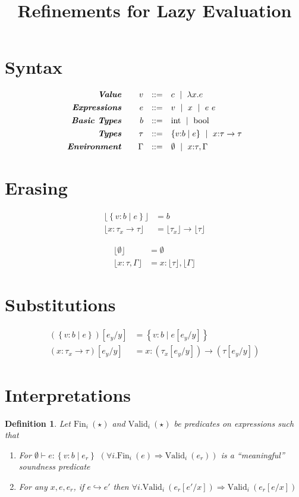 \documentclass[10pt,a4paper]{article}
\title{Refinements for Lazy Evaluation}
\newtheorem{definition}{Definition}
\newcommand\efun[2]{\ensuremath{\lambda #1 . #2}}
\newcommand\eapp[2]{\ensuremath{#1 \ #2}}
\newcommand\tint{\ensuremath{\text{int}}}
\newcommand\tbool{\ensuremath{\text{bool}}}
\newcommand\tref[3]{\ensuremath{\left\lbrace #1 \colon #2 \mid #3 \right\rbrace}}
\newcommand\tfun[3]{\ensuremath{#1\colon #2 \rightarrow #3}}
\newcommand\validi[1]{\ensuremath{\text{Valid}_{i}\ (#1)}}
\newcommand\fini[1]{\ensuremath{\text{Fin}_{i}\ (#1)}}
\newcommand\generalconditionInterp[2]
	{\ensuremath{(\forall i. \fini{#1} \Rightarrow \validi{#2})}}
\newcommand\generalconditionImpl[2]
	{\ensuremath{\forall i . \validi{#1} \Rightarrow \validi{#2}}}
\newcommand\sub[2]{\ensuremath{\left[ #2 / #1 \right]}}
\newcommand\erase[1]{\ensuremath{\lfloor #1 \rfloor}}
\newcommand\eval[2]{\ensuremath{#1 \hookrightarrow #2}}
\newcommand\hastype[3]{\ensuremath{#1 \vdash #2 \colon #3}}
\begin{document}
\section*{Syntax}
$$
\begin{array}{rrcl}
\emphbf{Value} \quad 
  & v
  & ::= 
  &   	 c 
  \spmid \efun{x}{e} 
  \\[0.05in] 


\emphbf{Expressions} \quad 
  & e
  & ::= 
  &   	 v 
  \spmid x 
  \spmid \eapp{e}{e}    
  \\[0.05in] 

\emphbf{Basic Types} \quad 
  & b
  & ::=  
  & 	\tint \spmid \tbool
  \\[0.05in] 

\emphbf{Types} \quad 
  & \tau
  & ::=  
  & 	\tref{v}{b}{e}
  \spmid \tfun{x}{\tau}{\tau}    
  \\[0.05in] 

\emphbf{Environment} \quad 
  & \Gamma
  & ::= 
  &     \emptyset \spmid x\colon \tau, \Gamma

\end{array}
$$



\section*{Erasing}
\begin{align*}
\erase{\tref{v}{b}{e}}&=b\\
\erase{\tfun{x}{\tau_x}{\tau}}&= \erase{\tau_x} \rightarrow \erase{\tau}
\end{align*}

\begin{align*}
\erase{\emptyset}&=\emptyset\\
\erase{x\colon\tau, \Gamma}&= x\colon\erase{\tau},\erase{\Gamma}
\end{align*}

\section*{Substitutions}
\begin{align*}
(\tref{v}{b}{e})\sub{y}{e_y} &=\tref{v}{b}{e\sub{y}{e_y}}\\
(\tfun{x}{\tau_x}{\tau})\sub{y}{e_y} &=\tfun{x}{(\tau_x\sub{y}{e_y})}{(\tau\sub{y}{e_y})}
\end{align*}

\section*{Interpretations}
\begin{definition}
Let \fini{\star} and \validi{\star} be predicates on expressions such that
\begin{enumerate}
\item 
	For \hastype{\emptyset}{e}{\tref{v}{b}{e_r}}
	\generalconditionInterp{e}{e_r} is a ``meaningful''
	soundness predicate

\item For any $x, e, e_r$, if \eval{e}{e'} then 
	\generalconditionImpl{e_r\sub{x}{e'}}{e_r\sub{x}{e}}
\end{enumerate} 
\end{definition}
\end{document}

